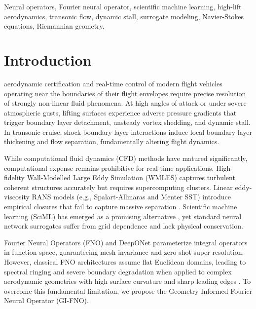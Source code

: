 \documentclass[journal,10pt,twocolumn]{IEEEtran}
\begin{document}
\begin{IEEEkeywords}
Neural operators, Fourier neural operator, scientific machine learning, high-lift aerodynamics, transonic flow, dynamic stall, surrogate modeling, Navier-Stokes equations, Riemannian geometry.
\end{IEEEkeywords}

\section{Introduction}
 aerodynamic certification and real-time control of modern flight vehicles operating near the boundaries of their flight envelopes require precise resolution of strongly non-linear fluid phenomena. At high angles of attack or under severe atmospheric gusts, lifting surfaces experience adverse pressure gradients that trigger boundary layer detachment, unsteady vortex shedding, and dynamic stall. In transonic cruise, shock-boundary layer interactions induce local boundary layer thickening and flow separation, fundamentally altering flight dynamics.

While computational fluid dynamics (CFD) methods have matured significantly, computational expense remains prohibitive for real-time applications. High-fidelity Wall-Modelled Large Eddy Simulation (WMLES) captures turbulent coherent structures accurately but requires supercomputing clusters. Linear eddy-viscosity RANS models (e.g., Spalart-Allmaras and Menter SST) introduce empirical closures that fail to capture massive separation \cite{leishman2002}. Scientific machine learning (SciML) has emerged as a promising alternative \cite{brunton2020}, yet standard neural network surrogates suffer from grid dependence and lack physical conservation.

Fourier Neural Operators (FNO) \cite{li2020fourier} and DeepONet \cite{lu2021learning} parameterize integral operators in function space, guaranteeing mesh-invariance and zero-shot super-resolution. However, classical FNO architectures assume flat Euclidean domains, leading to spectral ringing and severe boundary degradation when applied to complex aerodynamic geometries with high surface curvature and sharp leading edges \cite{li2023geofno}. To overcome this fundamental limitation, we propose the Geometry-Informed Fourier Neural Operator (GI-FNO).
\end{document}
